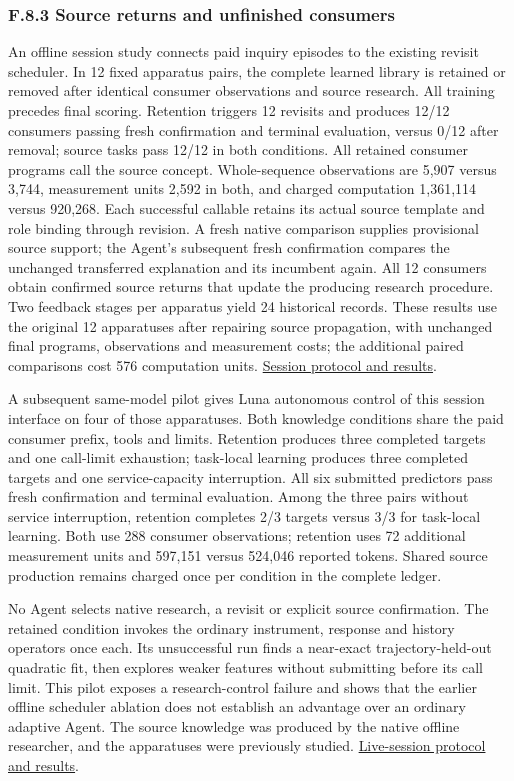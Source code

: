 \documentclass[twoside,11pt]{article}
\begin{document}
\subsubsection*{F.8.3 Source returns and unfinished consumers}

An offline session study connects paid inquiry episodes to the existing revisit
scheduler. In 12 fixed apparatus pairs, the complete learned library is retained
or removed after identical consumer observations and source research. All training
precedes final scoring. Retention triggers 12 revisits and produces 12/12 consumers
passing fresh confirmation and terminal evaluation, versus 0/12 after removal;
source tasks pass 12/12 in both conditions. All retained consumer programs call
the source concept. Whole-sequence observations are 5,907 versus 3,744,
measurement units 2,592 in both, and charged computation 1,361,114 versus 920,268.
Each successful callable retains its actual source template and role binding
through revision. A fresh native comparison supplies provisional source support;
the Agent's subsequent fresh confirmation compares the unchanged transferred
explanation and its incumbent again. All 12 consumers obtain confirmed source
returns that update the producing research procedure. Two feedback stages per
apparatus yield 24 historical records. These results use the original 12
apparatuses after repairing source propagation, with unchanged final programs,
observations and measurement costs; the additional paired comparisons cost 576
computation units. \hyperlink{artifact-77}{Session protocol and results}.


A subsequent same-model pilot gives Luna autonomous control of this session
interface on four of those apparatuses. Both knowledge conditions share the
paid consumer prefix, tools and limits. Retention produces three completed targets
and one call-limit exhaustion; task-local learning produces three completed targets
and one service-capacity interruption. All six submitted predictors pass fresh
confirmation and terminal evaluation. Among the three pairs without service
interruption, retention completes 2/3 targets versus 3/3 for task-local learning.
Both use 288 consumer observations; retention uses 72 additional measurement
units and 597,151 versus 524,046 reported tokens. Shared source production remains
charged once per condition in the complete ledger.


No Agent selects native research, a revisit or explicit source confirmation.
The retained condition invokes the ordinary instrument, response and history
operators once each. Its unsuccessful run finds a near-exact trajectory-held-out
quadratic fit, then explores weaker features without submitting before its call
limit. This pilot exposes a research-control failure and shows that the earlier
offline scheduler ablation does not establish an advantage over an ordinary
adaptive Agent. The source knowledge was produced by the native offline researcher,
and the apparatuses were previously studied. \hyperlink{artifact-78}{Live-session protocol and results}.
\end{document}
